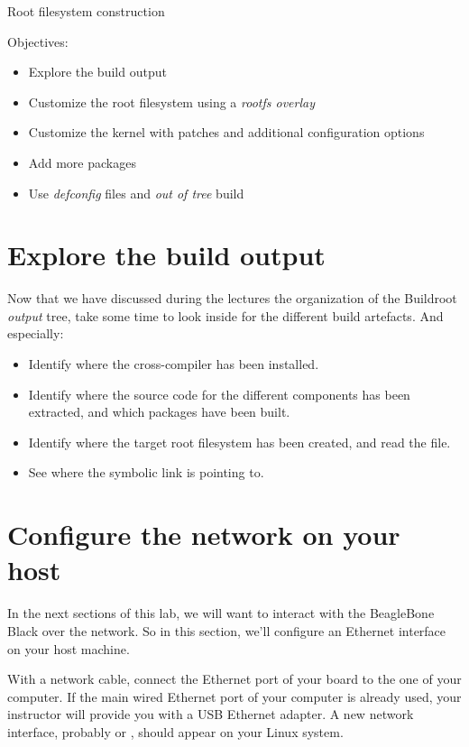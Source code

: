 \subchapter
{Root filesystem construction}
{Objectives:
  \begin{itemize}
  \item Explore the build output
  \item Customize the root filesystem using a {\em rootfs overlay}
  \item Customize the kernel with patches and additional configuration
    options
  \item Add more packages
  \item Use {\em defconfig} files and {\em out of tree} build
  \end{itemize}
}

\section{Explore the build output}

Now that we have discussed during the lectures the organization of the
Buildroot {\em output} tree, take some time to look inside
 for the different build artefacts. And especially:

\begin{itemize}

\item Identify where the cross-compiler has been installed.

\item Identify where the source code for the different components has
  been extracted, and which packages have been built.

\item Identify where the target root filesystem has been created, and
  read the  file.

\item See where the  symbolic link is pointing to.

\end{itemize}

\section{Configure the network on your host}

In the next sections of this lab, we will want to interact with the
BeagleBone Black over the network. So in this section, we'll configure
an Ethernet interface on your host machine.

With a network cable, connect the Ethernet port of your board to the
one of your computer. If the main wired Ethernet port of your computer
is already used, your instructor will provide you with a USB Ethernet
adapter. A new network interface, probably  or ,
should appear on your Linux system.

